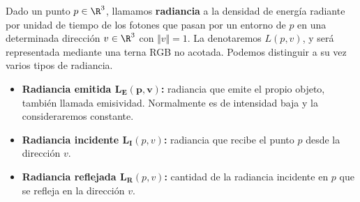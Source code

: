\begin{definicion}[Radiancia]
    Dado un punto $p\in\R^3$, llamamos \textbf{radiancia} a la densidad de energía radiante por unidad de tiempo de los fotones que pasan por un entorno de $p$ en una determinada dirección $v\in\R^3$ con $\Vert v\Vert = 1$. La denotaremos $L(p,v)$, y será representada mediante una terna RGB no acotada. Podemos distinguir a su vez varios tipos de radiancia.
    \begin{itemize}
        \item \textbf{Radiancia emitida $\boldsymbol{L_E(p,v)}$:} radiancia que emite el propio objeto, también llamada emisividad. Normalmente es de intensidad baja y la consideraremos constante.
        \item \textbf{Radiancia incidente $\boldsymbol{L_{I}}(p,v)$:} radiancia que recibe el punto $p$ desde la dirección $v$. 
        \item \textbf{Radiancia reflejada $\boldsymbol{L_{R}}(p,v)$:} cantidad de la radiancia incidente en $p$ que se refleja en la dirección $v$. 
\end{itemize}
\end{definicion}

